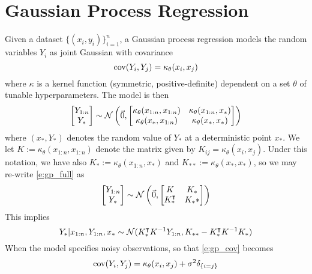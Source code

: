 \section{Gaussian Process Regression} 
Given a dataset $\{(x_i,y_i)\}_{i=1}^n$, a Gaussian process regression models the random variables $Y_i$ as joint Gaussian with covariance 
\begin{equation} \label{e:gp_cov}
    \operatorname{cov}(Y_i,Y_j) = \kappa_\theta(x_i,x_j)
\end{equation}
where $\kappa$ is a kernel function (symmetric, positive-definite) dependent on a set $\theta$ of tunable hyperparameters.  The model is then
\begin{equation}\label{e:gp_full}
    \begin{bmatrix} Y_{1:n} \\ Y_* \end{bmatrix}
    \sim \mathcal{N}\left( \vec 0, \begin{bmatrix} \kappa_\theta(x_{1:n},x_{1:n}) & \kappa_\theta(x_{1:n},x_*) \\ \kappa_\theta(x_*,x_{1:n}) &  \kappa_\theta(x_*,x_*) \end{bmatrix} \right)
\end{equation}
where $(x_*,Y_*)$ denotes the random value of $Y_*$ at a deterministic point $x_*$.  We let  $K := \kappa_\theta(x_{1:n},x_{1:n})$ denote the matrix given by $K_{ij} = \kappa_\theta(x_i,x_j)$.  Under this notation, we have also $K_*:= \kappa_\theta(x_{1:n},x_*)$ and $K_{**} := \kappa_\theta(x_*,x_*)$, so we may re-write \eqref{e:gp_full} as
\begin{equation}\label{e:gp_abbrev}
    \begin{bmatrix} Y_{1:n} \\ Y_* \end{bmatrix}
    \sim \mathcal{N}\left( \vec 0, \begin{bmatrix} K & K_* \\ K_*^\intercal &  K_** \end{bmatrix} \right)
\end{equation}
This implies
\begin{equation} \label{e:gp_inf}
    Y_*|x_{1:n},Y_{1:n}, x_*
    \sim \mathcal{N}(K_*^\intercal K^{-1} Y_{1:n}, K_{**} - K_*^\intercal K^{-1} K_*)
\end{equation}
When the model specifies noisy observations, so that \eqref{e:gp_cov} becomes
\begin{equation} \label{e:gp_cov_noisey}
    \operatorname{cov}(Y_i,Y_j) = \kappa_\theta(x_i,x_j) + \sigma^2 \delta_{\{i=j\}}
\end{equation}
